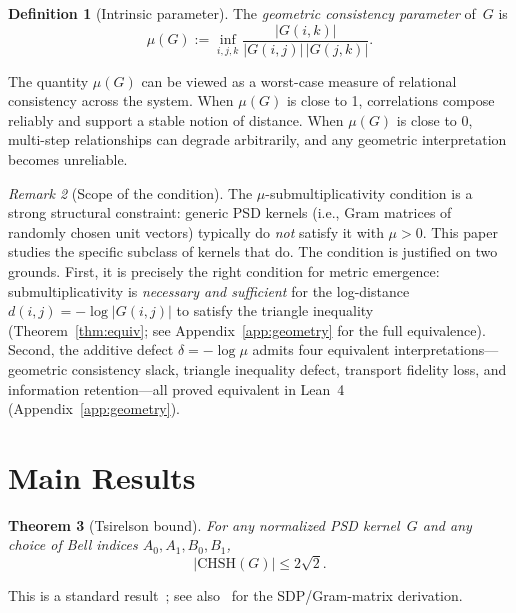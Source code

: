 \documentclass[11pt,a4paper]{article}
\newtheorem{theorem}{Theorem}[section]
\theoremstyle{definition}
\newtheorem{definition}[theorem]{Definition}
\theoremstyle{remark}
\newtheorem{remark}[theorem]{Remark}
\newcommand{\CHSH}{\mathrm{CHSH}}
\begin{document}
\begin{definition}[Intrinsic parameter]
The \emph{geometric consistency parameter} of~$G$ is
\[
\mu(G) := \inf_{i,j,k} \frac{|G(i,k)|}{|G(i,j)|\,|G(j,k)|}.
\]
\end{definition}

The quantity $\mu(G)$ can be viewed as a worst-case measure of relational consistency across the system. When $\mu(G)$ is close to 1, correlations compose reliably and support a stable notion of distance. When $\mu(G)$ is close to 0, multi-step relationships can degrade arbitrarily, and any geometric interpretation becomes unreliable.

\begin{remark}[Scope of the condition]\label{rmk:scope}
The $\mu$-submultiplicativity condition is a strong structural constraint: generic PSD kernels (i.e., Gram matrices of randomly chosen unit vectors) typically do \emph{not} satisfy it with $\mu > 0$. This paper studies the specific subclass of kernels that do. The condition is justified on two grounds. First, it is precisely the right condition for metric emergence: submultiplicativity is \emph{necessary and sufficient} for the log-distance $d(i,j) = -\log|G(i,j)|$ to satisfy the triangle inequality (Theorem~\ref{thm:equiv}; see Appendix~\ref{app:geometry} for the full equivalence). Second, the additive defect $\delta = -\log\mu$ admits four equivalent interpretations---geometric consistency slack, triangle inequality defect, transport fidelity loss, and information retention---all proved equivalent in Lean~4 (Appendix~\ref{app:geometry}).
\end{remark}


\section{Main Results}\label{sec:results}

\begin{theorem}[Tsirelson bound]\label{thm:tsirelson}
For any normalized PSD kernel~$G$ and any choice of Bell indices $A_0, A_1, B_0, B_1$,
\[
|\CHSH(G)| \le 2\sqrt{2}.
\]
\end{theorem}

This is a standard result~\cite{tsirelson1980,tsirelson1987}; see also~\cite{wehner2006} for the SDP/Gram-matrix derivation.
\end{document}
